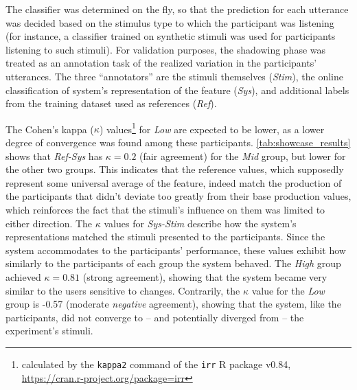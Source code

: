 The classifier was determined on the fly, so that the prediction for each utterance was decided based on the stimulus type to which the participant was listening (for instance, a classifier trained on synthetic stimuli was used for participants listening to such stimuli).
For validation purposes, the shadowing phase was treated as an annotation task of the realized variation in the participants' utterances.
The three \enquote{annotators} are the stimuli themselves (\emph{Stim}), the online classification of system's representation of the feature (\emph{Sys}), and additional labels from the training dataset used as references (\emph{Ref}).

The Cohen's kappa ($\kappa$) values\footnote{calculated by the \texttt{kappa2} command of the \texttt{irr} R package v0.84, \url{https://cran.r-project.org/package=irr}} for \emph{Low} are expected to be lower, as a lower degree of convergence was found among these participants.
\cref{tab:showcase_results} shows that \emph{Ref-Sys} has $\kappa = 0.2$ (fair agreement) for the \emph{Mid} group, but lower for the other two groups.
This indicates that the reference values, which supposedly represent some universal average of the feature, indeed match the production of the participants that didn't deviate too greatly from their base production values, which reinforces the fact that the stimuli's influence on them was limited to either direction.
The $\kappa$ values for \emph{Sys-Stim} describe how the system's representations matched the stimuli presented to the participants.
Since the system accommodates to the participants' performance, these values exhibit how similarly to the participants of each group the system behaved.
The \emph{High} group achieved $\kappa = 0.81$ (strong agreement), showing that the system became very similar to the users sensitive to changes.
Contrarily, the $\kappa$ value for the \emph{Low} group is -0.57 (moderate \emph{negative} agreement), showing that the system, like the participants, did not converge to -- and potentially diverged from -- the experiment's stimuli.
%
